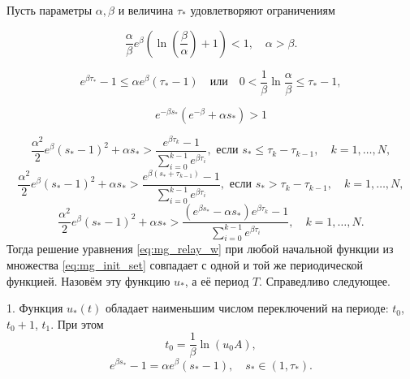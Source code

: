 \begin{theorem}
	\label{thm:mg_auxiliary_main}
	Пусть параметры $\alpha, \beta$ и величина $\tau_*$ удовлетворяют ограничениям
	
	\begin{equation}
		\label{eq:cond_thm1}
		\frac{\alpha}{\beta}e^{\beta}\left(\ln\left(\frac{\beta}{\alpha}\right)+1\right) < 1,
		\quad
		\alpha > \beta.
	\end{equation}
	
	\begin{equation}
		\label{eq:cond_thm2}
		e^{\beta \tau_*}-1 \leqslant \alpha e^\beta(\tau_*-1)
		\quad\text{или}\quad
		0 < \frac{1}{\beta}\ln\frac{\alpha}{\beta}\leqslant\tau_*-1,
	\end{equation}
	
	\begin{equation}
		\label{eq:cond_th_w>1_t_1+1}
		e^{-\beta s_*}(e^{-\beta}+\alpha s_*)>1
	\end{equation}
	
	\begin{equation}
		\label{eq:cond_hair_hair_01}
		\frac{\alpha^2}{2}e^\beta(s_*-1)^2+\alpha s_*>\frac{e^{\beta \tau_k}-1}{\sum_{i=0}^{k-1}e^{\beta \tau_i}},\text{ если } s_*\leqslant \tau_k-\tau_{k-1},\quad k=1,\ldots,N,
	\end{equation}
	\begin{equation}
		\label{eq:cond_hair_hair_02}
		\frac{\alpha^2}{2}e^\beta(s_*-1)^2+\alpha s_*>\frac{e^{\beta (s_*+\tau_{k-1})}-1}{\sum_{i=0}^{k-1}e^{\beta \tau_i}},\text{ если } s_* > \tau_k-\tau_{k-1},\quad k=1,\ldots,N,
	\end{equation}
	\begin{equation}
		\label{eq:cond_hair_hair_1}
		\frac{\alpha^2}{2}e^\beta( s_*-1)^2+\alpha s_*>\frac{(e^{\beta s_*}-\alpha s_*)e^{\beta \tau_k}-1}{\sum_{i=0}^{k-1}e^{\beta \tau_i}},\quad k=1,\ldots,N.
	\end{equation}
	Тогда решение уравнения \eqref{eq:mg_relay_w} при любой начальной функции из множества \eqref{eq:mg_init_set} совпадает с одной и той же периодической функцией. Назовём эту функцию $u_*$, а её период $T$. Справедливо следующее.
	
	1. Функция $u_*(t)$ обладает наименьшим числом переключений на периоде: $t_0$, $t_0+1$, $t_1$. При этом 
	\begin{equation*}
		t_0=\frac{1}{\beta}\ln(u_0 A),
	\end{equation*}
	\begin{equation}
		e^{\beta s_*} - 1=\alpha e^{\beta}(s_* - 1), \quad s_* \in (1, \tau_*).
	\end{equation}
	

\end{theorem}
